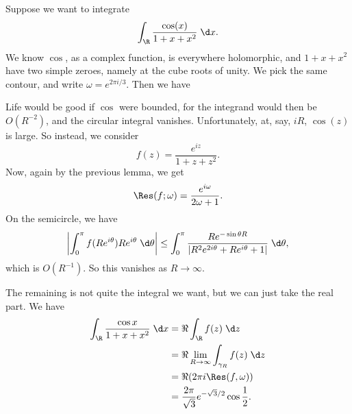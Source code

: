 \documentclass[a4paper]{article}
\begin{document}
\begin{eg}
  Suppose we want to integrate
  \[
    \int_\R \frac{\cos (x)}{1 + x + x^2}\;\d x.
  \]
  We know $\cos$, as a complex function, is everywhere holomorphic, and $1 + x + x^2$ have two simple zeroes, namely at the cube roots of unity. We pick the same contour, and write $\omega = e^{2\pi i/3}$. Then we have
  \begin{center}
  \end{center}
  Life would be good if $\cos$ were bounded, for the integrand would then be $O(R^{-2})$, and the circular integral vanishes. Unfortunately, at, say, $iR$, $\cos(z)$ is large. So instead, we consider
  \[
    f(z) = \frac{e^{iz}}{1 + z + z^2}.
  \]
  Now, again by the previous lemma, we get
  \[
    \Res(f; \omega) = \frac{e^{i\omega}}{2\omega + 1}.
  \]
  On the semicircle, we have
  \[
    \left|\int_0^\pi f(Re^{i\theta}) Re^{i\theta}\;\d \theta\right| \leq \int_0^\pi \frac{Re^{-\sin \theta R}}{|R^2 e^{2i \theta} + Re^{i\theta} + 1|} \;\d \theta,
  \]
  which is $O(R^{-1})$. So this vanishes as $R \to \infty$.

  The remaining is not quite the integral we want, but we can just take the real part. We have
  \begin{align*}
    \int_{\R} \frac{\cos x}{1 + x + x^2}\;\d x &= \Re \int_\R f(z)\;\d z\\
    &= \Re \lim_{R \to \infty} \int_{\gamma_R} f(z)\;\d z\\
    &= \Re (2\pi i \Res(f, \omega))\\
    &= \frac{2\pi}{\sqrt{3}} e^{-\sqrt{3}/2}\cos \frac{1}{2} .
  \end{align*}
\end{eg}
\end{document}
